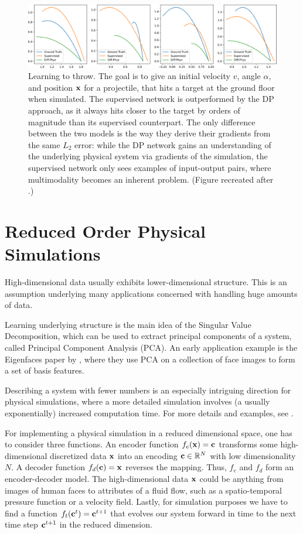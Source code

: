 \begin{figure}
  \centering
  \includegraphics[width=\textwidth]{figures/throwing_results}
  \caption{Learning to throw. The goal is to give an initial velocity $v$, angle
    $\alpha$, and position $\vb{x}$ for a projectile, that hits a target at the
    ground floor when simulated.  The supervised network is outperformed by the
    \ac{DP} approach, as it always hits closer to the target by orders of
    magnitude than its supervised counterpart.  The only difference between the
    two models is the way they derive their gradients from the same $L_2$
    error: while the \ac{DP} network gains an understanding of the underlying
    physical system via gradients of the simulation, the supervised network only
    sees examples of input-output pairs, where multimodality becomes an inherent
    problem.  (Figure recreated after \citet{LearnToThrow}.)
  }
    \label{fig:learning-to-throw}
\end{figure}

\section{Reduced Order Physical Simulations}
High-dimensional data usually exhibits lower-dimensional
structure. This is an assumption underlying many applications concerned with
handling huge amounts of data.

Learning underlying structure is the main idea of the Singular
Value Decomposition, which can be used to extract principal components of
a system, called Principal Component Analysis (PCA). An early application
example is the Eigenfaces paper by \cite{eigenface1987}, where they use
PCA on a collection of face images to form a set of basis features.

Describing a system with fewer numbers is an especially intriguing direction for
physical simulations, where a more detailed simulation involves (a usually
exponentially) increased computation time. For more details and examples, see
\cite{BruntonKnutz2019}.

For implementing a physical simulation in a reduced dimensional space, one has
to consider three functions. An encoder function $f_e(\vb{x}) = \vb{c}$
transforms some high-dimensional discretized data $\vb{x}$ into an encoding
$\vb{c} \in \mathbb{R}^{N}$ with low dimensionality $N$. A decoder function
$f_d(\vb{c}) = \vb{x}$ reverses the mapping. Thus, $f_e$ and $f_d$ form an
encoder-decoder model. The high-dimensional data $\vb{x}$ could be anything from
images of human faces to attributes of a fluid flow, such as a spatio-temporal
pressure function or a velocity field. Lastly, for simulation purposes we have
to find a function $f_t(\vb{c}^t) = \vb{c}^{t+1}$ that evolves our system
forward in time to the next time step $\vb{c}^{t+1}$ in the reduced dimension.

